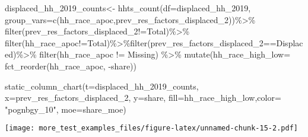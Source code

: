 \documentclass[
]{article}
\newenvironment{Shaded}{\begin{snugshade}}{\end{snugshade}}
\newcommand{\AttributeTok}[1]{\textcolor[rgb]{0.77,0.63,0.00}{#1}}
\newcommand{\FunctionTok}[1]{\textcolor[rgb]{0.00,0.00,0.00}{#1}}
\newcommand{\NormalTok}[1]{#1}
\newcommand{\OtherTok}[1]{\textcolor[rgb]{0.56,0.35,0.01}{#1}}
\newcommand{\SpecialCharTok}[1]{\textcolor[rgb]{0.00,0.00,0.00}{#1}}
\newcommand{\StringTok}[1]{\textcolor[rgb]{0.31,0.60,0.02}{#1}}
\begin{document}
\begin{Shaded}
\begin{Highlighting}[]
\NormalTok{displaced\_hh\_2019\_counts}\OtherTok{\textless{}{-}} \FunctionTok{hhts\_count}\NormalTok{(}\AttributeTok{df=}\NormalTok{displaced\_hh\_2019, }\AttributeTok{group\_vars=}\FunctionTok{c}\NormalTok{(}\StringTok{\textquotesingle{}hh\_race\_apoc\textquotesingle{}}\NormalTok{,}\StringTok{\textquotesingle{}prev\_res\_factors\_displaced\_2\textquotesingle{}}\NormalTok{))}\SpecialCharTok{\%\textgreater{}\%}
\FunctionTok{filter}\NormalTok{(prev\_res\_factors\_displaced\_2}\SpecialCharTok{!=}\StringTok{\textquotesingle{}Total\textquotesingle{}}\NormalTok{)}\SpecialCharTok{\%\textgreater{}\%}
  \FunctionTok{filter}\NormalTok{(hh\_race\_apoc}\SpecialCharTok{!=}\StringTok{\textquotesingle{}Total\textquotesingle{}}\NormalTok{)}\SpecialCharTok{\%\textgreater{}\%}\FunctionTok{filter}\NormalTok{(prev\_res\_factors\_displaced\_2}\SpecialCharTok{==}\StringTok{\textquotesingle{}Displaced\textquotesingle{}}\NormalTok{)}\SpecialCharTok{\%\textgreater{}\%}
  \FunctionTok{filter}\NormalTok{(hh\_race\_apoc }\SpecialCharTok{!=} \StringTok{\textquotesingle{}Missing\textquotesingle{}}\NormalTok{) }\SpecialCharTok{\%\textgreater{}\%}
  \FunctionTok{mutate}\NormalTok{(}\AttributeTok{hh\_race\_high\_low=} \FunctionTok{fct\_reorder}\NormalTok{(hh\_race\_apoc, }\SpecialCharTok{{-}}\NormalTok{share))}

\FunctionTok{static\_column\_chart}\NormalTok{(}\AttributeTok{t=}\NormalTok{displaced\_hh\_2019\_counts, }\AttributeTok{x=}\StringTok{\textquotesingle{}prev\_res\_factors\_displaced\_2\textquotesingle{}}\NormalTok{, }\AttributeTok{y=}\StringTok{\textquotesingle{}share\textquotesingle{}}\NormalTok{, }\AttributeTok{fill=}\StringTok{\textquotesingle{}hh\_race\_high\_low\textquotesingle{}}\NormalTok{,}\AttributeTok{color=}  \StringTok{"pognbgy\_10"}\NormalTok{, }\AttributeTok{moe=}\StringTok{\textquotesingle{}share\_moe\textquotesingle{}}\NormalTok{)}
\end{Highlighting}
\end{Shaded}

\texttt{[image: more\_test\_examples\_files/figure-latex/unnamed-chunk-15-2.pdf]}
\end{document}
